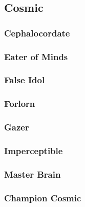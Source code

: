 \subsection{Cosmic}
\begin{multicols}{2}
    \subsubsection*{Cephalocordate}\label{foe:cephalocordate}
    \subsubsection*{Eater of Minds}\label{foe:eater-of-minds}
    \subsubsection*{False Idol}\label{foe:false-idol}
    \subsubsection*{Forlorn}\label{foe:forlorn}
    \subsubsection*{Gazer}\label{foe:gazer}
    \subsubsection*{Imperceptible}\label{foe:imperceptible}
    \subsubsection*{Master Brain}\label{foe:master-brain}
\end{multicols}
\subsubsection{Champion Cosmic}

